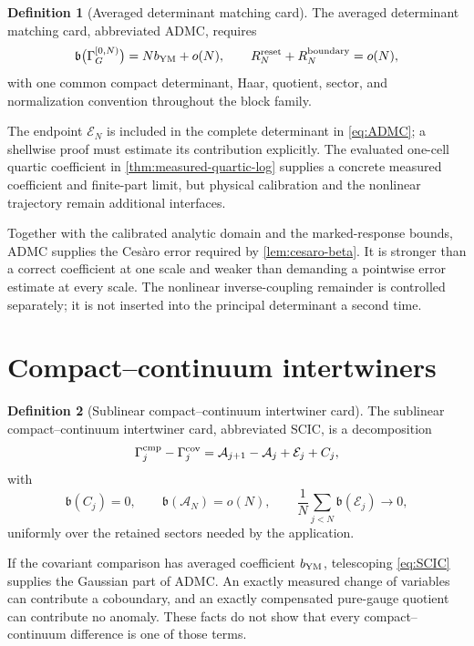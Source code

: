 \documentclass[11pt,oneside,openany]{book}
\theoremstyle{definition}
\newtheorem{definition}[definition]{Definition}
\theoremstyle{remark}
\newcommand{\src}[2]{\cite[#2]{#1}}
\begin{document}
\begin{definition}[Averaged determinant matching card]\label{def:ADMC}
The averaged determinant matching card, abbreviated ADMC, requires
\begin{equation}\label{eq:ADMC}
\mathfrak b\bigl(\Gamma_G^{[0,N)}\bigr)=Nb_{\rm YM}+o(N),
\qquad R_N^{\rm reset}+R_N^{\rm boundary}=o(N),
\end{equation}
with one common compact determinant, Haar, quotient, sector, and normalization convention throughout the block family.
\end{definition}

The endpoint $\mathcal E_N$ is included in the complete determinant
in \cref{eq:ADMC}; a shellwise proof must estimate its contribution
explicitly. The evaluated one-cell quartic coefficient in
\cref{thm:measured-quartic-log} supplies a concrete measured
coefficient and finite-part limit, but physical calibration and the
nonlinear trajectory remain additional interfaces.

Together with the calibrated analytic domain and the marked-response bounds, ADMC supplies the Ces\`aro error required by \cref{lem:cesaro-beta}. It is stronger than a correct coefficient at one scale and weaker than demanding a pointwise error estimate at every scale. The nonlinear inverse-coupling remainder is controlled separately; it is not inserted into the principal determinant a second time. \src{F9}{V13--V15}

\section{Compact--continuum intertwiners}
\begin{definition}[Sublinear compact--continuum intertwiner card]\label{def:SCIC}
The sublinear compact--continuum intertwiner card, abbreviated SCIC, is a decomposition
\begin{equation}\label{eq:SCIC}
\Gamma^{\rm cmp}_j-\Gamma^{\rm cov}_j
=\mathcal A_{j+1}-\mathcal A_j+\mathcal E_j+C_j,
\end{equation}
with
\[
\mathfrak b(C_j)=0,\qquad
\mathfrak b(\mathcal A_N)=o(N),\qquad
\frac1N\sum_{j<N}\mathfrak b(\mathcal E_j)\longrightarrow0,
\]
uniformly over the retained sectors needed by the application.
\end{definition}

If the covariant comparison has averaged coefficient $b_{\rm YM}$, telescoping \cref{eq:SCIC} supplies the Gaussian part of ADMC. An exactly measured change of variables can contribute a coboundary, and an exactly compensated pure-gauge quotient can contribute no anomaly. These facts do not show that every compact--continuum difference is one of those terms.
\end{document}
